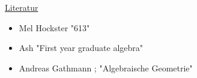 \underline{Literatur}
\begin{itemize}
\item Mel Hockster "613"
\item Ash "First year graduate algebra"
\item Andreas Gathmann ; "Algebraische Geometrie"
\end{itemize}

